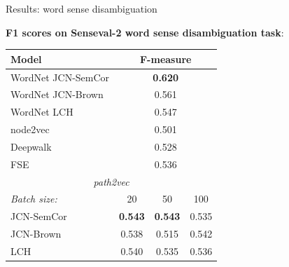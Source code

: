 \begin{frame}{Results: word sense disambiguation}

\textbf{F1 scores on Senseval-2 word sense disambiguation task}:

\begin{table}
\footnotesize
\begin{tabular}{lccc}
\toprule
Model & \multicolumn{3}{c}{F-measure} \\
\midrule
WordNet JCN-SemCor & \multicolumn{3}{c}{\textbf{0.620}} \\
WordNet JCN-Brown &   \multicolumn{3}{c}{0.561} \\
WordNet LCH & \multicolumn{3}{c}{0.547} \\
node2vec~\cite{grover2016node2vec} & \multicolumn{3}{c}{0.501} \\
Deepwalk~\cite{perozzi2014deepwalk} & \multicolumn{3}{c}{0.528} \\
FSE~\cite{subercaze:2015}  & \multicolumn{3}{c}{0.536} \\
\midrule
\multicolumn{4}{c}{ \textit{path2vec}} \\
\midrule
\textit{Batch size:} & 20 & 50 & 100 \\
\midrule
JCN-SemCor & \textbf{0.543} & \textbf{0.543} & 0.535 \\
JCN-Brown & 0.538 & 0.515 & 0.542 \\
LCH & 0.540 & 0.535 & 0.536 \\
\bottomrule
\end{tabular}
\end{table}
	
\end{frame}



